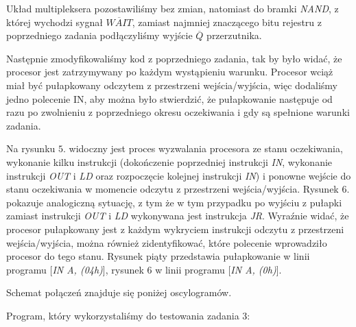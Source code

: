 \documentclass[fleqn]{article}
\begin{document}
Układ multipleksera pozostawiliśmy bez zmian, natomiast do bramki \textit{NAND}, z której wychodzi sygnał $\overline{WAIT}$, zamiast najmniej znaczącego bitu rejestru z poprzedniego zadania podłączyliśmy wyjście $\overline{Q}$ przerzutnika.

Następnie zmodyfikowaliśmy kod z poprzedniego zadania, tak by było widać, że procesor jest zatrzymywany po każdym wystąpieniu warunku. Procesor wciąż miał być pułapkowany odczytem z przestrzeni wejścia/wyjścia, więc dodaliśmy jedno polecenie IN, aby można było stwierdzić, że pułapkowanie następuje od razu po zwolnieniu z poprzedniego okresu oczekiwania i gdy są spełnione warunki zadania.

Na rysunku $5$. widoczny jest proces wyzwalania procesora ze stanu oczekiwania, wykonanie kilku instrukcji (dokończenie poprzedniej instrukcji \textit{IN}, wykonanie instrukcji \textit{OUT} i \textit{LD} oraz rozpoczęcie kolejnej instrukcji \textit{IN}) i ponowne wejście do stanu oczekiwania w momencie odczytu z przestrzeni wejścia/wyjścia. Rysunek $6$. pokazuje analogiczną sytuację, z tym że w tym przypadku po wyjściu z pułapki zamiast instrukcji \textit{OUT} i \textit{LD} wykonywana jest instrukcja \textit{JR}.
Wyraźnie widać, że procesor pułapkowany jest z każdym wykryciem instrukcji odczytu z przestrzeni wejścia/wyjścia, można również zidentyfikować, które polecenie wprowadziło procesor do tego stanu. Rysunek piąty przedstawia pułapkowanie w linii programu [\textit{IN A, (04h)}], rysunek 6 w linii programu [\textit{IN A, (0h)}].

Schemat połączeń znajduje się poniżej oscylogramów.

Program, który wykorzystaliśmy do testowania zadania 3:


\end{document}
